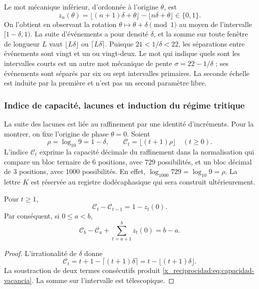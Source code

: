 Le mot mécanique inférieur, d'ordonnée à l'origine \(\theta\), est
\[
 z_n(\theta)=\lfloor(n+1)\delta+\theta\rfloor-\lfloor n\delta+\theta\rfloor\in\{0,1\}.
\]
On l'obtient en observant la rotation \(\theta\mapsto\theta+\delta\pmod1\) au moyen de l'intervalle \([1-\delta,1)\). La suite d'événements a pour densité \(\delta\), et la somme sur toute fenêtre de longueur \(L\) vaut \(\lfloor L\delta\rfloor\) ou \(\lceil L\delta\rceil\). Puisque \(21<1/\delta<22\), les séparations entre événements sont vingt et un ou vingt-deux. Le mot qui indique quels sont les intervalles courts est un autre mot mécanique de pente \(\sigma=22-1/\delta\) ; ses événements sont séparés par six ou sept intervalles primaires. La seconde échelle est induite par la première et n'est pas un second paramètre libre.


\subsubsection{Indice de capacité, lacunes et induction du régime tritique}
\label{x_reciprocidad:vac-capacidad-trit}

La suite des lacunes est liée au raffinement par une
identité d'incréments. Pour la montrer, on fixe l'origine de phase
\(\theta=0\). Soient
\[
 \rho=\log_{10}9=1-\delta,\qquad
 \mathcal C_t=\lfloor(t+1)\rho\rfloor\quad(t\geq0).
\]
L'indice \(\mathcal C_t\) exprime la capacité décimale du raffinement
dans la normalisation qui compare un bloc ternaire de \(6\) positions,
avec \(729\) possibilités, et un bloc décimal de \(3\) positions, avec
\(1000\) possibilités. En effet,
\(\log_{1000}729=\log_{10}9=\rho\). La lettre \(K\) est réservée au
registre dodécaphasique qui sera construit ultérieurement.

\begin{proposition}
\label{x_reciprocidad:prop:capacidad-vacancia}
Pour \(t\geq1\),
\begin{equation}
 \mathcal C_t-\mathcal C_{t-1}=1-z_t(0).
 \label{x_reciprocidad:eq:capacidad-vacancia}
\end{equation}
Par conséquent, si \(0\leq a<b\),
\[
 \mathcal C_b-\mathcal C_a+
 \sum_{t=a+1}^{b}z_t(0)=b-a.
\]
\end{proposition}
\begin{proof}
L'irrationalité de \(\delta\) donne
\[
 \mathcal C_t
 =t+1-\lceil(t+1)\delta\rceil
 =t-\lfloor(t+1)\delta\rfloor.
\]
La soustraction de deux termes consécutifs produit
\eqref{x_reciprocidad:eq:capacidad-vacancia}. La somme sur l'intervalle est télescopique.
\end{proof}

